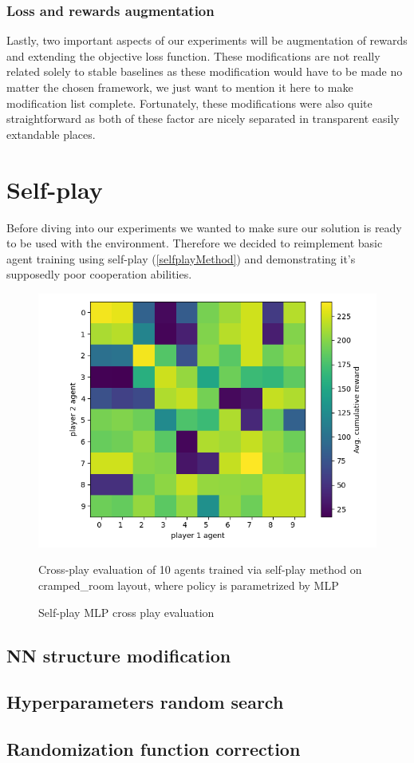 \subsubsection*{Loss and rewards augmentation}
Lastly, two important aspects of our experiments will be augmentation of rewards and extending the objective loss function.
These modifications are not really related solely to stable baselines as these modification would have to be made no matter the chosen framework, we just want to mention it here to make modification list complete. 
Fortunately, these modifications were also quite straightforward as both of these factor are nicely separated in transparent easily extandable places.

\section{Self-play}
Before diving into our experiments we wanted to make sure our solution is ready to be used with the environment.
Therefore we decided to reimplement basic agent training using self-play (\ref{selfplayMethod}) and demonstrating it's supposedly poor cooperation abilities.



\begin{figure}[!ht]
    \centering
    \includegraphics*[width=13cm]{../img/MLP_OFF_DIAG_TEST.png}
    \caption{Self-play MLP cross play evaluation}
    \medskip
    \small 
    Cross-play evaluation of 10 agents trained via self-play method on cramped\_room layout, where policy is parametrized by MLP

\end{figure}


\subsection{NN structure modification}

\subsection{Hyperparameters random search}

\subsection{Randomization function correction}





